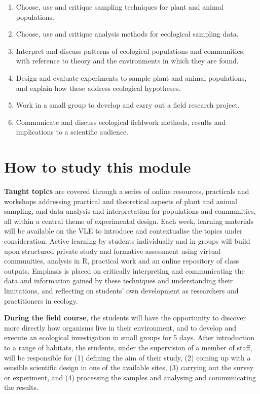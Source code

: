 \documentclass[
  letterpaper,
  DIV=11,
  numbers=noendperiod]{scrreprt}
\providecommand{\tightlist}{%
  \setlength{\itemsep}{0pt}\setlength{\parskip}{0pt}}
\begin{document}
\begin{enumerate}
\def\labelenumi{\arabic{enumi}.}
\tightlist
\item
  Choose, use and critique sampling techniques for plant and animal
  populations.
\item
  Choose, use and critique analysis methods for ecological sampling
  data.
\item
  Interpret and discuss patterns of ecological populations and
  communities, with reference to theory and the environments in which
  they are found.
\item
  Design and evaluate experiments to sample plant and animal
  populations, and explain how these address ecological hypotheses.
\item
  Work in a small group to develop and carry out a field research
  project.
\item
  Communicate and discuss ecological fieldwork methods, results and
  implications to a scientific audience.
\end{enumerate}

\section*{How to study this module}\label{how-to-study-this-module}


\textbf{Taught topics} are covered through a series of online resources,
practicals and workshops addressing practical and theoretical aspects of
plant and animal sampling, and data analysis and interpretation for
populations and communities, all within a central theme of experimental
design. Each week, learning materials will be available on the VLE to
introduce and contextualise the topics under consideration. Active
learning by students individually and in groups will build upon
structured private study and formative assessment using virtual
communities, analysis in R, practical work and an online repository of
class outputs. Emphasis is placed on critically interpreting and
communicating the data and information gained by these techniques and
understanding their limitations, and reflecting on students' own
development as researchers and practitioners in ecology.

\textbf{During the field course}, the students will have the opportunity
to discover more directly how organisms live in their environment, and
to develop and execute an ecological investigation in small groups for 5
days. After introduction to a range of habitats, the students, under the
supervision of a member of staff, will be responsible for (1) defining
the aim of their study, (2) coming up with a sensible scientific design
in one of the available sites, (3) carrying out the survey or
experiment, and (4) processing the samples and analysing and
communicating the results.
\end{document}
